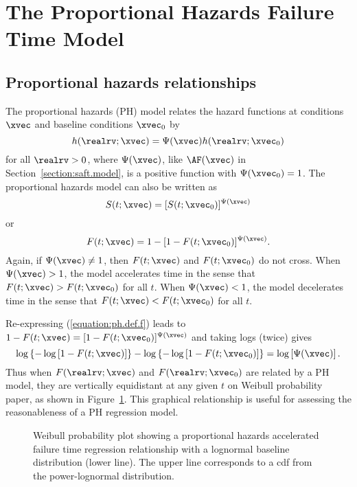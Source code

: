 \section{The Proportional Hazards Failure Time Model}
\label{section:prohaz.fail}

\subsection{Proportional hazards relationships}
The proportional hazards (PH) model relates the hazard functions at
conditions $\xvec$ and baseline conditions $\xvec_{0}$ by
\begin{equation}
\label{equation:ph.def.h}
h(\realrv; \xvec)=\Psi(\xvec) h(\realrv; \xvec_{0})
\end{equation}
for all $\realrv>0$, where $\Psi(\xvec)$, like $\AF(\xvec)$ in
Section~\ref{section:saft.model}, is a positive function with
$\Psi(\xvec_{0})=1$.  The proportional hazards model 
can also be
written as
\begin{equation}
\label{equation:ph.def.s}
S(t;\xvec) = [S(t;\xvec_{0})]^{\Psi(\xvec)}
\end{equation}
or
\begin{equation}
\label{equation:ph.def.f}
F(t;\xvec) = 1- [1-F(t;\xvec_{0})]^{\Psi(\xvec)}.
\end{equation}
Again, if
$\Psi(\xvec) \ne 1$, then $F(t;\xvec)$ and $F(t;\xvec_{0})$ do not
cross. When $\Psi(\xvec) >1$, the model accelerates time in the sense
that $F(t;\xvec) > F(t;\xvec_{0})$ for all $t$.  When $\Psi(\xvec)<1$,
the model decelerates time in the sense that $F(t;\xvec) <
F(t;\xvec_{0})$ for all $t$. 

Re-expressing (\ref{equation:ph.def.f}) leads to
$1-F(t;\xvec)=[1-F(t;\xvec_{0})]^{\Psi(\xvec)}$ and taking logs
(twice) gives
\begin{equation}
\label{equation:log.log.phft}
\log  \left \{-\log   \left [1- F(t;\xvec)   \right ]\right \}
- \log \left \{-\log \left [1-F(t;\xvec_{0}) \right ]\right \} = \log
\left [ \Psi(\xvec) \right ].
\end{equation}
Thus when $F(\realrv; \xvec)$ and $F(\realrv; \xvec_{0})$ are related by
a PH model, they are vertically equidistant at any given $t$ on
Weibull probability paper, as shown in
Figure~\ref{figure:lawless.lognor.ph.ps}. This graphical
relationship is useful for assessing the reasonableness of a PH
regression model.

\begin{figure}
\caption{Weibull probability plot showing a
proportional hazards accelerated failure time regression relationship
with a lognormal baseline distribution (lower line). The upper line
corresponds to a cdf from the power-lognormal distribution.}
\label{figure:lawless.lognor.ph.ps}
\end{figure}

